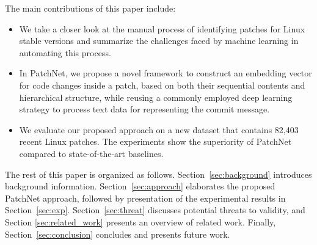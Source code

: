 The main contributions of this paper include:

\begin{itemize}[leftmargin=0.4cm]
\item We take a closer look at the manual process of identifying patches for Linux stable versions and summarize the challenges faced by machine learning in automating this process.
  
 \item In PatchNet, we propose a novel framework to construct an embedding vector for code changes inside a patch, based on both their sequential contents and hierarchical structure, while reusing a commonly employed deep learning strategy to
process text data for representing the commit message.
 
\item We evaluate our proposed approach on a new dataset that contains 82,403
  recent Linux
  patches. The experiments show the superiority of PatchNet compared to state-of-the-art baselines.  
\end{itemize}

The rest of this paper is organized as
follows. Section~\ref{sec:background} introduces background
information. Section~\ref{sec:approach} elaborates the proposed PatchNet
approach, followed by presentation of the experimental results in Section~\ref{sec:exp}. Section~\ref{sec:threat} discusses potential
threats to validity, and Section \ref{sec:related_work} presents an overview of related work. Finally, Section~\ref{sec:conclusion} concludes and presents future work.
